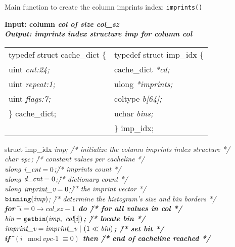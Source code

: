 \begin{algorithm}[t]
\caption{Main function to create the column imprints index:
\tt{imprints()}}
\label{alg:construction}
\small{
\bf{Input:} column \it{col} of size \it{col\_sz}\\
\bf{Output:} imprints index structure \it{imp} for column \it{col}
\begin{center}
{\small
\begin{tabularx}{\columnwidth}{ XX }
typedef struct cache\_dict \{&typedef struct imp\_idx \{\\
\hspace{0.5cm}uint \it{cnt}:24;&\hspace{0.5cm}cache\_dict \it{*cd};\\
\hspace{0.5cm}uint \it{repeat}:1;&\hspace{0.5cm}ulong \it{*imprints};\\
\hspace{0.5cm}uint \it{flags}:7;&\hspace{0.5cm}coltype \it{b}[64];\\
\} cache\_dict;&\hspace{0.5cm}uchar \it{bins}; \\
&\} imp\_idx;
\end{tabularx}
}
\vspace{-10pt}
\end{center}
\begin{tabbing}
struct imp\_idx \it{imp};
\` /* initialize the column imprints index structure */\\
char $\it{vpc}$; \` /* constant values per cacheline */\\
ulong $\it{i\_cnt}=0$;\` /* imprints count */\\
ulong $\it{d\_cnt}=0$;\` /* dictionary count */\\
ulong $\it{imprint\_v}=0$;\` /* the imprint vector */\\
$\tt{binning}(\it{imp})$;
\` /* determine the histogram's size and bin borders */\\
\bf{for}\=\ $\textit{i}=0\rightarrow \textit{col\_sz}-1$ \bf{do}
\` /* for all values in \it{col} */\\
\>$\it{bin} = \tt{getbin}(\it{imp},\ \it{col}[\it{i}])$;
\` /* locate bin */\\
\>$\it{imprint\_v} = \it{imprint\_v}\ |\ (1\ll \textit{bin})$;
\` /* set bit */\\
\>\bf{if}\=\ $(\textit{i}\mod\textit{vpc-1} \equiv 0)$ \bf{then}
\` /* end of cacheline reached */\\

\end{tabbing}}
\end{algorithm}
